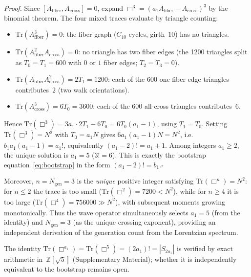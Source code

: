\documentclass[12pt,a4paper]{article}
\theoremstyle{definition}
\begin{document}
\noindent\textit{Proof.}  Since $[A_{\mathrm{fiber}}, A_{\mathrm{cross}}] = 0$, expand $\Box^3 = (a_1 A_{\mathrm{fiber}} - A_{\mathrm{cross}})^3$ by the binomial theorem.  The four mixed traces evaluate by triangle counting:
\begin{itemize}
\item $\mathrm{Tr}(A_{\mathrm{fiber}}^3) = 0$: the fiber graph ($C_{10}$ cycles, girth~$10$) has no triangles.
\item $\mathrm{Tr}(A_{\mathrm{fiber}}^2 A_{\mathrm{cross}}) = 0$: no triangle has two fiber edges (the 1200 triangles split as $T_0 = T_1 = 600$ with $0$ or $1$ fiber edges; $T_2 = T_3 = 0$).
\item $\mathrm{Tr}(A_{\mathrm{fiber}} A_{\mathrm{cross}}^2) = 2T_1 = 1200$: each of the $600$ one-fiber-edge triangles contributes~$2$ (two walk orientations).
\item $\mathrm{Tr}(A_{\mathrm{cross}}^3) = 6T_0 = 3600$: each of the $600$ all-cross triangles contributes~$6$.
\end{itemize}
Hence $\mathrm{Tr}(\Box^3) = 3a_1 \cdot 2T_1 - 6T_0 = 6T_0(a_1 - 1)$, using $T_1 = T_0$.  Setting $\mathrm{Tr}(\Box^3) = N^2$ with $T_0 = a_1 N$ gives $6a_1(a_1-1)N = N^2$, i.e.\ $b_1 a_1(a_1-1) = a_1!$, equivalently $(a_1-2)! = a_1 + 1$.  Among integers $a_1 \ge 2$, the unique solution is $a_1 = 5$ ($3! = 6$). This is exactly the bootstrap equation~\eqref{eq:bootstrap} in the form $(a_1-2)! = b_1$.\hfill$\square$

Moreover, $n = N_{\mathrm{gen}} = 3$ is the \emph{unique} positive integer satisfying $\mathrm{Tr}(\Box^n) = N^2$: for $n \le 2$ the trace is too small ($\mathrm{Tr}(\Box^2) = 7200 < N^2$), while for $n \ge 4$ it is too large ($\mathrm{Tr}(\Box^4) = 756000 \gg N^2$), with subsequent moments growing monotonically.  Thus the wave operator simultaneously selects $a_1 = 5$ (from the identity) and $N_{\mathrm{gen}} = 3$ (as the unique crossing exponent), providing an independent derivation of the generation count from the Lorentzian spectrum.

The identity $\mathrm{Tr}(\Box^{a_1}) = \mathrm{Tr}(\Box^5) = (2a_1)! = |S_{2a_1}|$ is verified by exact arithmetic in~$\mathbb{Z}[\sqrt{5}]$ (Supplementary Material); whether it is independently equivalent to the bootstrap remains open.
\end{document}
